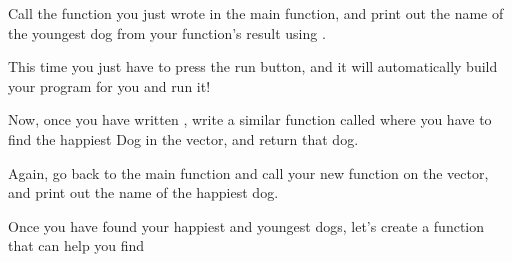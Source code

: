 \documentclass{tufte-handout}
\begin{document}
Call the function you just wrote in the main function, and print out the name of the youngest dog from your function's result using .  

This time you just have to press the run button, and it will automatically build your program for you and run it!

Now, once you have written 
, write a similar function called  where you have to find the happiest Dog in the vector, and return that dog.

Again, go back to the main function and call your new function on the  vector, and print out the name of the happiest dog.  

Once you have found your happiest and youngest dogs, let's create a function that can help you find 
\end{document}
